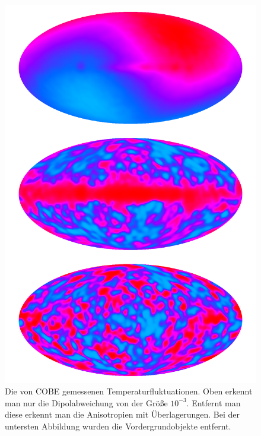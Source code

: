 \documentclass[10pt,a4paper]{article}
\begin{document}
\begin{figure}
\center
\includegraphics[scale=0.15]{COBE_cmb_2}
\caption{Die von COBE gemessenen Temperaturfluktuationen. Oben erkennt man nur die Dipolabweichung von der Größe $10^{-3}$. Entfernt man diese erkennt man die Anisotropien mit Überlagerungen. Bei der untersten Abbildung wurden die Vordergrundobjekte entfernt. } %
\label{cobe}
\end{figure}
\end{document}
